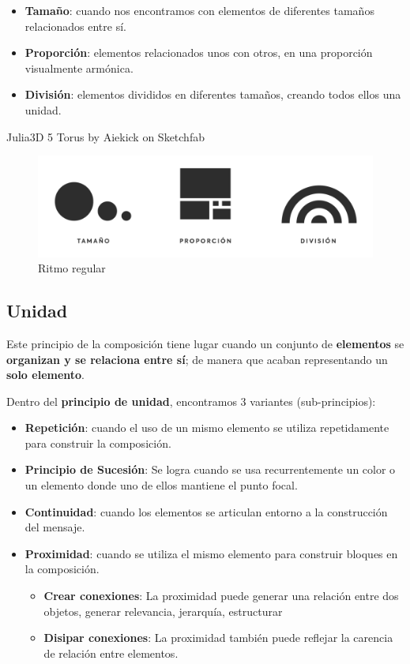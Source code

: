 \documentclass[
  16pt,
]{krantz}
\theoremstyle{definition}
\theoremstyle{definition}
\theoremstyle{definition}
\theoremstyle{definition}
\theoremstyle{remark}
\begin{document}
\begin{itemize}
\item
  \textbf{Tamaño}: cuando nos encontramos con elementos de diferentes tamaños relacionados entre sí.
\item
  \textbf{Proporción}: elementos relacionados unos con otros, en una proporción visualmente armónica.
\item
  \textbf{División}: elementos divididos en diferentes tamaños, creando todos ellos una unidad.
\end{itemize}

Julia3D 5 Torus by Aiekick on Sketchfab

\begin{figure}

{\centering \includegraphics[width=1\linewidth,height=1\textheight]{proporcion} 

}

\caption{Ritmo regular}\label{fig:proporcion}
\end{figure}

\hypertarget{unidad}{%
\subsection{Unidad}\label{unidad}}

Este principio de la composición tiene lugar cuando un conjunto de \textbf{elementos} se \textbf{organizan y se relaciona entre sí}; de manera que acaban representando un \textbf{solo elemento}.

Dentro del \textbf{principio de unidad}, encontramos 3 variantes (sub-principios):

\begin{itemize}
\item
  \textbf{Repetición}: cuando el uso de un mismo elemento se utiliza repetidamente para construir la composición.
\item
  \textbf{Principio de Sucesión}: Se logra cuando se usa recurrentemente un color o un elemento donde uno de ellos mantiene el punto focal.
\item
  \textbf{Continuidad}: cuando los elementos se articulan entorno a la construcción del mensaje.
\item
  \textbf{Proximidad}: cuando se utiliza el mismo elemento para construir bloques en la composición.

  \begin{itemize}
  \item
    \textbf{Crear conexiones}: La proximidad puede generar una relación entre dos objetos, generar relevancia, jerarquía, estructurar
  \item
    \textbf{Disipar conexiones}: La proximidad también puede reflejar la carencia de relación entre elementos.
  \end{itemize}
\end{itemize}
\end{document}
